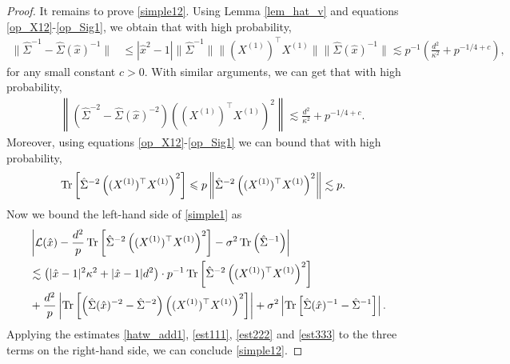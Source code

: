\begin{proof}
It remains to prove \eqref{simple12}. Using Lemma \ref{lem_hat_v} and equations \eqref{op_X12}-\eqref{op_Sig1}, we obtain that with high probability,
\begin{align}
 \|\hat\Sigma^{-1}-\hat\Sigma(\hat x)^{-1}\| &\le |\hat x^2-1|\|\hat\Sigma^{-1}\| \| (X^{(1)})^\top X^{(1)}\|\|\hat\Sigma(\hat x)^{-1}\|  \lesssim p^{-1}\left(\frac{d^2}{\kappa^2} + p^{-1/4+c}\right),\label{est111}
\end{align}
for any small constant $c>0$. With similar arguments, we can get that with high probability,
\begin{align}\label{est222}
&\left\|\left(\hat\Sigma^{-2}-\hat\Sigma(\hat x)^{-2}\right)\left((X^{(1)})^\top X^{(1)} \right)^2\right\| \lesssim  \frac{d^2}{\kappa^2} + p^{-1/4+c} .
\end{align}
Moreover, using equations \eqref{op_X12}-\eqref{op_Sig1} we can bound that with high probability,
\begin{align}
& \operatorname{Tr}\left[ \hat\Sigma^{-2} \left((X^{(1)})^{\top}X^{(1)}\right)^2\right]  \leqslant p \left\| \hat\Sigma^{-2} \left((X^{(1)})^{\top}X^{(1)}\right)^2 \right\|\lesssim p.\label{est333}
\end{align}
Now we bound the left-hand side of \eqref{simple1} as %
\begin{align*}
&\left|\mathcal L(\hat x)-\frac{d^2}{p}\operatorname{Tr}\left[\hat\Sigma^{-2} \left((X^{(1)})^\top X^{(1)} \right)^2\right] -\sigma^2  \operatorname{Tr}\left({\hat\Sigma^{-1}  }\right)\right| \\
&\lesssim \left(|\hat x-1|^2 \kappa^2 + |\hat x-1|d^2\right)\cdot p^{-1}\operatorname{Tr}\left[ \hat\Sigma^{-2} \left((X^{(1)})^{\top}X^{(1)}\right)^2 \right] \\
&+ \frac{d^2}{p}\left|\operatorname{Tr}\left[\left(\hat\Sigma(\hat x)^{-2}-\hat\Sigma^{-2}\right) \left((X^{(1)})^\top X^{(1)} \right)^2\right]\right|+ \sigma^2  \left|\operatorname{Tr}\left[\hat\Sigma(\hat x)^{-1}-\hat\Sigma^{-1}  \right]\right|.
\end{align*}
Applying the estimates \eqref{hatw_add1}, \eqref{est111}, \eqref{est222} and \eqref{est333} to the three terms on the right-hand side, we can conclude \eqref{simple12}.

\end{proof}

